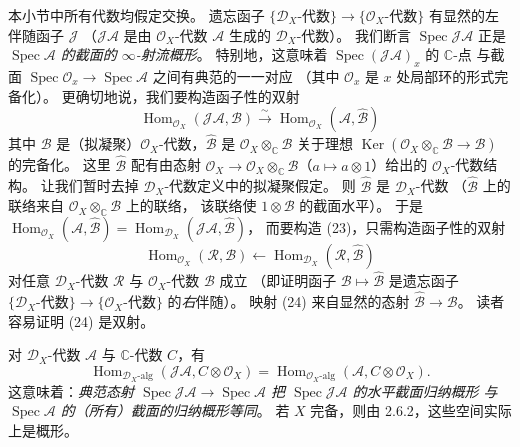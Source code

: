  本小节中所有代数均假定交换。
遗忘函子 $\{\mathcal{D}_X\text{-代数}\}\to\{\mathcal{O}_X\text{-代数}\}$ 有显然的左伴随函子 $\mathcal{J}$
（$\mathcal{J}\mathcal{A}$ 是由 $\mathcal{O}_X$-代数 $\mathcal{A}$ 生成的 $\mathcal{D}_X$-代数）。
我们断言 $\operatorname{Spec}\mathcal{J}\mathcal{A}$ 正是
\emph{$\operatorname{Spec}\mathcal{A}$ 的截面的 $\infty$-射流概形}。
特别地，这意味着 $\operatorname{Spec}(\mathcal{J}\mathcal{A})_x$ 的 $\mathbb{C}$-点
与截面 $\operatorname{Spec}\mathcal{O}_x\to\operatorname{Spec}\mathcal{A}$ 之间有典范的一一对应
（其中 $\mathcal{O}_x$ 是 $x$ 处局部环的形式完备化）。
更确切地说，我们要构造函子性的双射
\begin{equation}\tag{23}
\operatorname{Hom}_{\mathcal{O}_X}(\mathcal{J}\mathcal{A},\mathcal{B})
\overset{\sim}{\longrightarrow}
\operatorname{Hom}_{\mathcal{O}_X}(\mathcal{A},\hat{\mathcal{B}})
\end{equation}
其中 $\mathcal{B}$ 是（拟凝聚）$\mathcal{O}_X$-代数，$\hat{\mathcal{B}}$ 是
$\mathcal{O}_X\otimes_{\mathbb{C}}\mathcal{B}$ 关于理想
$\operatorname{Ker}(\mathcal{O}_X\otimes_{\mathbb{C}}\mathcal{B}\to\mathcal{B})$ 的完备化。
这里 $\hat{\mathcal{B}}$ 配有由态射
$\mathcal{O}_X\to\mathcal{O}_X\otimes_{\mathbb{C}}\mathcal{B}$（$a\mapsto a\otimes 1$）给出的
$\mathcal{O}_X$-代数结构。
让我们暂时去掉 $\mathcal{D}_X$-代数定义中的拟凝聚假定。
则 $\hat{\mathcal{B}}$ 是 $\mathcal{D}_X$-代数
（$\hat{\mathcal{B}}$ 上的联络来自 $\mathcal{O}_X\otimes_{\mathbb{C}}\mathcal{B}$ 上的联络，
该联络使 $1\otimes\mathcal{B}$ 的截面水平）。
于是 $\operatorname{Hom}_{\mathcal{O}_X}(\mathcal{A},\hat{\mathcal{B}})
=\operatorname{Hom}_{\mathcal{D}_X}(\mathcal{J}\mathcal{A},\hat{\mathcal{B}})$，
而要构造 (23)，只需构造函子性的双射
\begin{equation}\tag{24}
\operatorname{Hom}_{\mathcal{O}_X}(\mathcal{R},\mathcal{B})
\longleftarrow
\operatorname{Hom}_{\mathcal{D}_X}(\mathcal{R},\hat{\mathcal{B}})
\end{equation}
对任意 $\mathcal{D}_X$-代数 $\mathcal{R}$ 与 $\mathcal{O}_X$-代数 $\mathcal{B}$ 成立
（即证明函子 $\mathcal{B}\mapsto\hat{\mathcal{B}}$ 是遗忘函子
$\{\mathcal{D}_X\text{-代数}\}\to\{\mathcal{O}_X\text{-代数}\}$ 的\emph{右}伴随）。
映射 (24) 来自显然的态射 $\hat{\mathcal{B}}\to\mathcal{B}$。
读者容易证明 (24) 是双射。

对 $\mathcal{D}_X$-代数 $\mathcal{A}$ 与 $\mathbb{C}$-代数 $C$，有
\[
\operatorname{Hom}_{\mathcal{D}_X\text{-alg}}(\mathcal{J}\mathcal{A},C\otimes\mathcal{O}_X)
=\operatorname{Hom}_{\mathcal{O}_X\text{-alg}}(\mathcal{A},C\otimes\mathcal{O}_X).
\]
这意味着：\emph{典范态射 $\operatorname{Spec}\mathcal{J}\mathcal{A}\to\operatorname{Spec}\mathcal{A}$
把 $\operatorname{Spec}\mathcal{J}\mathcal{A}$ 的水平截面归纳概形
与 $\operatorname{Spec}\mathcal{A}$ 的（所有）截面的归纳概形等同}。
若 $X$ 完备，则由 2.6.2，这些空间实际上是概形。

